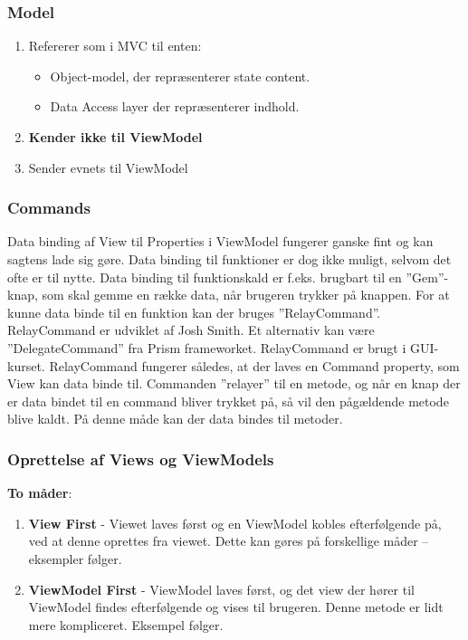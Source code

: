 \subsubsection{Model}
\begin{enumerate}
	\item Refererer som i MVC til enten:
	\begin{itemize}
		\item Object-model, der repræsenterer state content.
		\item Data Access layer der repræsenterer indhold.
	\end{itemize}
	\item \textbf{Kender ikke til ViewModel}
	\item Sender evnets til ViewModel
\end{enumerate}

\subsubsection{Commands}
Data binding af View til Properties i ViewModel fungerer ganske fint og kan sagtens lade sig gøre. Data binding til funktioner er dog ikke muligt, selvom det ofte er til nytte. Data binding til funktionskald er f.eks. brugbart til en ”Gem”-knap, som skal gemme en række data, når brugeren trykker på knappen.
For at kunne data binde til en funktion kan der bruges ”RelayCommand”. RelayCommand er udviklet af Josh Smith. Et alternativ kan være ”DelegateCommand” fra Prism frameworket. RelayCommand er brugt i GUI-kurset.
RelayCommand fungerer således, at der laves en Command property, som View kan data binde til. Commanden ”relayer” til en metode, og når en knap der er data bindet til en command bliver trykket på, så vil den pågældende metode blive kaldt. På denne måde kan der data bindes til metoder.

\subsubsection{Oprettelse af Views og ViewModels}
\textbf{To måder}:
\begin{enumerate}
	\item \textbf{View First} - Viewet laves først og en ViewModel kobles efterfølgende på, ved at denne oprettes fra viewet. Dette kan gøres på forskellige måder – eksempler følger.
	\item \textbf{ViewModel First} - ViewModel laves først, og det view der hører til ViewModel findes efterfølgende og vises til brugeren. Denne metode er lidt mere kompliceret. Eksempel følger.
\end{enumerate}

